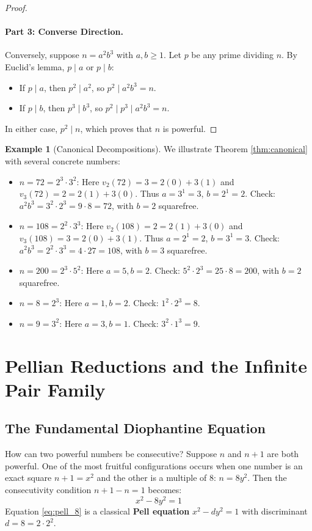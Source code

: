 \documentclass[11pt,a4paper]{article}
\theoremstyle{definition}
\newtheorem{example}[theorem]{Example}
\begin{document}
\begin{proof}
\paragraph{Part 3: Converse Direction.}
Conversely, suppose $n = a^2 b^3$ with $a, b \ge 1$.
Let $p$ be any prime dividing $n$. By Euclid's lemma, $p \mid a$ or $p \mid b$:
\begin{itemize}
    \item If $p \mid a$, then $p^2 \mid a^2$, so $p^2 \mid a^2 b^3 = n$.
    \item If $p \mid b$, then $p^3 \mid b^3$, so $p^2 \mid p^3 \mid a^2 b^3 = n$.
\end{itemize}
In either case, $p^2 \mid n$, which proves that $n$ is powerful.
\end{proof}

\begin{example}[Canonical Decompositions]
We illustrate Theorem \ref{thm:canonical} with several concrete numbers:
\begin{itemize}
    \item $n = 72 = 2^3 \cdot 3^2$: Here $v_2(72)=3=2(0)+3(1)$ and $v_3(72)=2=2(1)+3(0)$. Thus $a = 3^1 = 3$, $b = 2^1 = 2$. Check: $a^2 b^3 = 3^2 \cdot 2^3 = 9 \cdot 8 = 72$, with $b=2$ squarefree.
    \item $n = 108 = 2^2 \cdot 3^3$: Here $v_2(108)=2=2(1)+3(0)$ and $v_3(108)=3=2(0)+3(1)$. Thus $a = 2^1 = 2$, $b = 3^1 = 3$. Check: $a^2 b^3 = 2^2 \cdot 3^3 = 4 \cdot 27 = 108$, with $b=3$ squarefree.
    \item $n = 200 = 2^3 \cdot 5^2$: Here $a = 5, b = 2$. Check: $5^2 \cdot 2^3 = 25 \cdot 8 = 200$, with $b=2$ squarefree.
    \item $n = 8 = 2^3$: Here $a = 1, b = 2$. Check: $1^2 \cdot 2^3 = 8$.
    \item $n = 9 = 3^2$: Here $a = 3, b = 1$. Check: $3^2 \cdot 1^3 = 9$.
\end{itemize}
\end{example}

\section{Pellian Reductions and the Infinite Pair Family}

\subsection{The Fundamental Diophantine Equation}
How can two powerful numbers be consecutive?
Suppose $n$ and $n+1$ are both powerful. One of the most fruitful configurations occurs when one number is an exact square $n+1 = x^2$ and the other is a multiple of $8$: $n = 8y^2$.
Then the consecutivity condition $n+1 - n = 1$ becomes:
\begin{equation}\label{eq:pell_8}
x^2 - 8y^2 = 1
\end{equation}
Equation \eqref{eq:pell_8} is a classical \textbf{Pell equation} $x^2 - d y^2 = 1$ with discriminant $d = 8 = 2 \cdot 2^2$.
\end{document}
